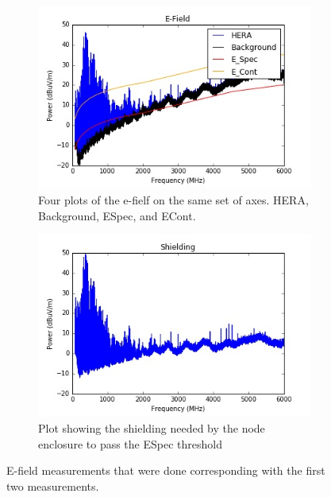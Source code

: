 \documentclass[12pt,a4paper]{report}
\begin{document}
{{			\begin{figure}[h!]
				\centering
				\begin{subfigure}[b]{0.49\textwidth}
					\includegraphics[width=\textwidth]{E-Field.jpeg}
					\caption{Four plots of the e-fielf on the same set of axes. HERA, Background, E\textunderscore Spec, and E\textunderscore Cont.}
					\label{fig:E-Field}
				\end{subfigure}
				\hfill
				\begin{subfigure}[b]{0.49\textwidth}
					\includegraphics[width=\textwidth]{shield.jpeg}
					\caption{Plot showing the shielding needed by the node enclosure to pass the E\textunderscore Spec threshold}
					\label{fig:shield}
				\end{subfigure}
				\caption{E-field measurements that were done corresponding with the first two measurements.}
			\end{figure}
			
}}
\end{document}
